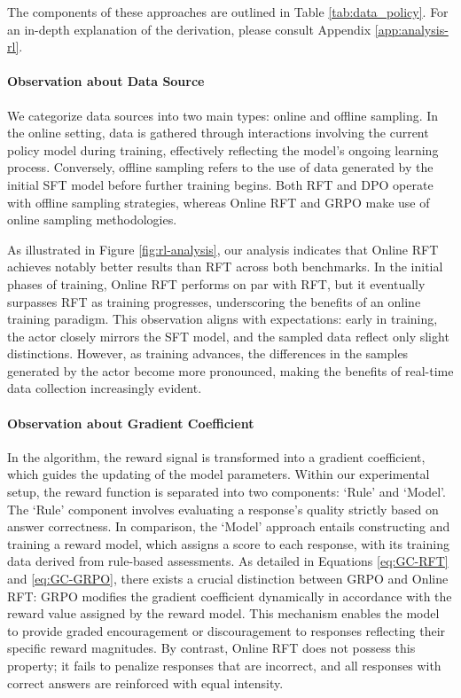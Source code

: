The components of these approaches are outlined in Table \ref{tab:data_policy}. For an in-depth explanation of the derivation, please consult Appendix \ref{app:analysis-rl}.

\paragraph{Observation about Data Source} We categorize data sources into two main types: online and offline sampling. In the online setting, data is gathered through interactions involving the current policy model during training, effectively reflecting the model's ongoing learning process. Conversely, offline sampling refers to the use of data generated by the initial SFT model before further training begins. Both RFT and DPO operate with offline sampling strategies, whereas Online RFT and GRPO make use of online sampling methodologies.

As illustrated in Figure \ref{fig:rl-analysis}, our analysis indicates that Online RFT achieves notably better results than RFT across both benchmarks. In the initial phases of training, Online RFT performs on par with RFT, but it eventually surpasses RFT as training progresses, underscoring the benefits of an online training paradigm. This observation aligns with expectations: early in training, the actor closely mirrors the SFT model, and the sampled data reflect only slight distinctions. However, as training advances, the differences in the samples generated by the actor become more pronounced, making the benefits of real-time data collection increasingly evident.

\paragraph{Observation about Gradient Coefficient} In the algorithm, the reward signal is transformed into a gradient coefficient, which guides the updating of the model parameters. Within our experimental setup, the reward function is separated into two components: `Rule' and `Model'. The `Rule' component involves evaluating a response’s quality strictly based on answer correctness. In comparison, the `Model' approach entails constructing and training a reward model, which assigns a score to each response, with its training data derived from rule-based assessments. As detailed in Equations \ref{eq:GC-RFT} and \ref{eq:GC-GRPO}, there exists a crucial distinction between GRPO and Online RFT: GRPO modifies the gradient coefficient dynamically in accordance with the reward value assigned by the reward model. This mechanism enables the model to provide graded encouragement or discouragement to responses reflecting their specific reward magnitudes. By contrast, Online RFT does not possess this property; it fails to penalize responses that are incorrect, and all responses with correct answers are reinforced with equal intensity.

